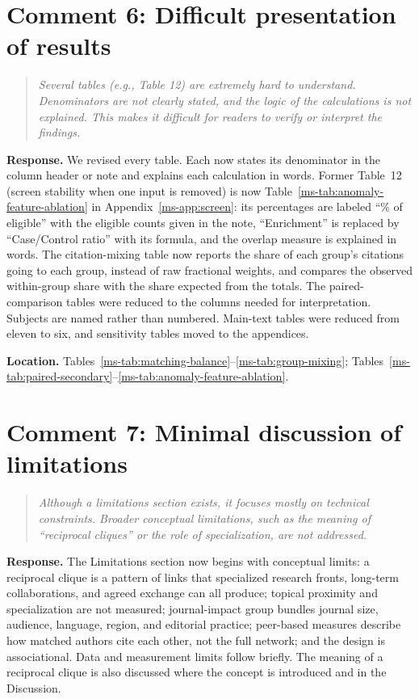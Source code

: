 \documentclass[11pt]{article}
\newcommand{\commenttext}[1]{\begin{quote}\itshape #1\end{quote}}
\newcommand{\response}{\textbf{Response.} }
\newcommand{\location}[1]{\textbf{Location.} #1.}
\begin{document}
\section*{Comment 6: Difficult presentation of results}

\commenttext{Several tables (e.g., Table 12) are extremely hard to understand. Denominators are not clearly stated, and the logic of the calculations is not explained. This makes it difficult for readers to verify or interpret the findings.}

\response We revised every table.  Each now states its denominator in the column header or note and explains each calculation in words.  Former Table~12 (screen stability when one input is removed) is now Table~\ref{ms-tab:anomaly-feature-ablation} in Appendix~\ref{ms-app:screen}: its percentages are labeled ``\% of eligible'' with the eligible counts given in the note, ``Enrichment'' is replaced by ``Case/Control ratio'' with its formula, and the overlap measure is explained in words.  The citation-mixing table now reports the share of each group's citations going to each group, instead of raw fractional weights, and compares the observed within-group share with the share expected from the totals.  The paired-comparison tables were reduced to the columns needed for interpretation.  Subjects are named rather than numbered.  Main-text tables were reduced from eleven to six, and sensitivity tables moved to the appendices.

\location{Tables~\ref{ms-tab:matching-balance}--\ref{ms-tab:group-mixing}; Tables~\ref{ms-tab:paired-secondary}--\ref{ms-tab:anomaly-feature-ablation}}

\section*{Comment 7: Minimal discussion of limitations}

\commenttext{Although a limitations section exists, it focuses mostly on technical constraints. Broader conceptual limitations, such as the meaning of ``reciprocal cliques'' or the role of specialization, are not addressed.}

\response The Limitations section now begins with conceptual limits: a reciprocal clique is a pattern of links that specialized research fronts, long-term collaborations, and agreed exchange can all produce; topical proximity and specialization are not measured; journal-impact group bundles journal size, audience, language, region, and editorial practice; peer-based measures describe how matched authors cite each other, not the full network; and the design is associational.  Data and measurement limits follow briefly.  The meaning of a reciprocal clique is also discussed where the concept is introduced and in the Discussion.
\end{document}
